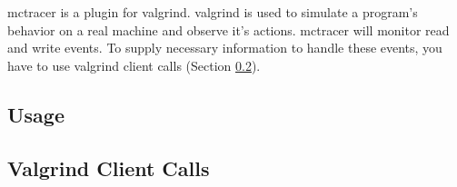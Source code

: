 mctracer is a plugin for valgrind.
valgrind is used to simulate a program's behavior on a real machine and observe it's actions.
mctracer will monitor read and write events.
To supply necessary information to handle these events, you have to use valgrind client calls (Section \ref{vgclientcalls}).
\subsection{Usage} 
\subsection{Valgrind Client Calls} \label{vgclientcalls} 
